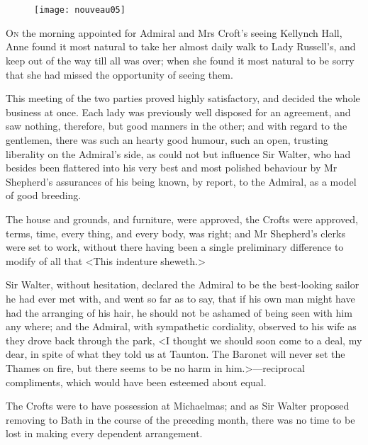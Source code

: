 \chapter[Chapter \thechapter]{}

\begin{figure}[t!]
\centering
\texttt{[image: nouveau05]}
\end{figure}

\lettrine[lraise=0.3]{O}{n} the morning appointed for Admiral and Mrs Croft's seeing Kellynch Hall, Anne found it most natural to take her almost daily walk to Lady Russell's, and keep out of the way till all was over; when she found it most natural to be sorry that she had missed the opportunity of seeing them.

This meeting of the two parties proved highly satisfactory, and decided the whole business at once. Each lady was previously well disposed for an agreement, and saw nothing, therefore, but good manners in the other; and with regard to the gentlemen, there was such an hearty good humour, such an open, trusting liberality on the Admiral's side, as could not but influence Sir Walter, who had besides been flattered into his very best and most polished behaviour by Mr Shepherd's assurances of his being known, by report, to the Admiral, as a model of good breeding.

The house and grounds, and furniture, were approved, the Crofts were approved, terms, time, every thing, and every body, was right; and Mr Shepherd's clerks were set to work, without there having been a single preliminary difference to modify of all that <This indenture sheweth.>

Sir Walter, without hesitation, declared the Admiral to be the best-looking sailor he had ever met with, and went so far as to say, that if his own man might have had the arranging of his hair, he should not be ashamed of being seen with him any where; and the Admiral, with sympathetic cordiality, observed to his wife as they drove back through the park, <I thought we should soon come to a deal, my dear, in spite of what they told us at Taunton. The Baronet will never set the Thames on fire, but there seems to be no harm in him.>—reciprocal compliments, which would have been esteemed about equal.

The Crofts were to have possession at Michaelmas; and as Sir Walter proposed removing to Bath in the course of the preceding month, there was no time to be lost in making every dependent arrangement.

